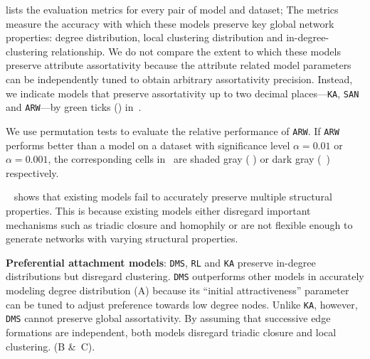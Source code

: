  lists the evaluation metrics for every pair of model
and dataset; The metrics measure the accuracy with which these models
preserve key global network properties: degree distribution, local clustering distribution
and in-degree-clustering relationship. We do not compare the extent to which these models preserve attribute assortativity because the attribute related model parameters can be independently tuned to obtain arbitrary assortativity precision. Instead, we indicate models that preserve assortativity up to two decimal
places---\texttt{KA}, \texttt{SAN} and \texttt{ARW}---by green ticks (\checkmark) in~.

We use permutation tests \cite{good2013permutation} to evaluate the relative
performance of \texttt{ARW}. If
\texttt{ARW} performs better than a model on a dataset with significance level
$\alpha=0.01$ or $\alpha=0.001$, the corresponding cells in~
are shaded gray ( \lightgraybg{ }) or dark gray (~\darkgraybg{ }) respectively.


~ shows that existing models fail to accurately preserve
{multiple} structural properties. This is because existing models either
disregard important mechanisms such as triadic closure and homophily or are not
flexible enough to generate networks with varying structural properties.


\textbf{Preferential attachment models}: \texttt{DMS}, \texttt{RL}
and \texttt{KA} preserve in-degree distributions but disregard
clustering. \texttt{DMS} outperforms other models in accurately modeling
degree distribution (A) because its ``initial attractiveness''
parameter can be tuned to adjust preference towards low degree nodes. Unlike \texttt{KA}, however,
\texttt{DMS} cannot preserve global assortativity.
By assuming that successive edge formations are independent, both models disregard
triadic closure and local clustering. (B \&~C).

